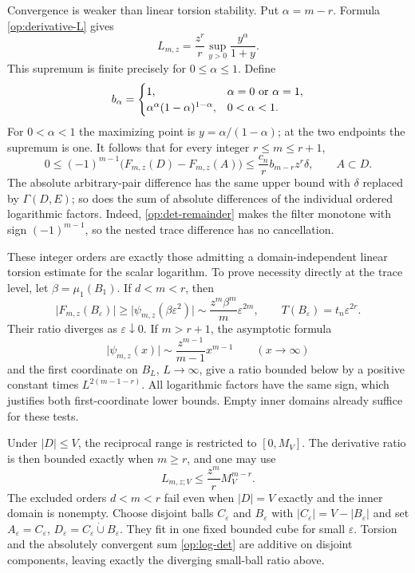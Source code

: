 \documentclass[11pt,reqno]{amsart}
\numberwithin{equation}{section}
\newcommand{\abs}[1]{\lvert#1\rvert}
\begin{document}
Convergence is weaker than linear torsion stability.  Put
$\alpha=m-r$.  Formula \eqref{op:derivative-L} gives
\[
 L_{m,z}=\frac{z^r}{r}
       \sup_{y>0}\frac{y^\alpha}{1+y}.
\]
This supremum is finite precisely for $0\le\alpha\le1$.
Define
\[
 b_\alpha=
 \begin{cases}
  1,&\alpha=0\ \hbox{or}\ \alpha=1,\\
  \alpha^\alpha(1-\alpha)^{1-\alpha},&0<\alpha<1.
 \end{cases}
\]
For $0<\alpha<1$ the maximizing point is
$y=\alpha/(1-\alpha)$; at the two endpoints the supremum is one.
It follows that for every integer $r\le m\le r+1$,
\begin{equation}\label{op:det-stability}
 0\le(-1)^{m-1}\bigl(F_{m,z}(D)-F_{m,z}(A)\bigr)
 \le\frac{c_n}{r}b_{m-r}z^r\delta,
 \qquad A\subset D.
\end{equation}
The absolute arbitrary-pair difference has the same upper bound
with $\delta$ replaced by $\Gamma(D,E)$; so does the sum of
absolute differences of the individual ordered logarithmic factors.
Indeed, \eqref{op:det-remainder} makes the filter monotone with
sign $(-1)^{m-1}$, so the nested trace difference has no
cancellation.

These integer orders are exactly those admitting a domain-independent
linear torsion estimate for the scalar logarithm.  To prove necessity
directly at the trace level, let $\beta=\mu_1(B_1)$.
If $d<m<r$, then
\[
 \abs{F_{m,z}(B_\varepsilon)}
 \ge\abs{\psi_{m,z}(\beta\varepsilon^2)}
 \sim\frac{z^m\beta^m}{m}\varepsilon^{2m},
 \qquad T(B_\varepsilon)=t_n\varepsilon^{2r}.
\]
Their ratio diverges as $\varepsilon\downarrow0$.
If $m>r+1$, the asymptotic formula
\[
 \abs{\psi_{m,z}(x)}
       \sim\frac{z^{m-1}}{m-1}x^{m-1}
       \qquad(x\to\infty)
\]
and the first coordinate on $B_L$, $L\to\infty$, give a ratio
bounded below by a positive constant times $L^{2(m-1-r)}$.
All logarithmic factors have the same sign, which justifies both
first-coordinate lower bounds.  Empty inner domains already suffice
for these tests.

Under $\abs D\le V$, the reciprocal range is restricted to
$[0,M_V]$.  The derivative ratio is then bounded exactly when
$m\ge r$, and one may use
\begin{equation}\label{op:det-local-L}
 L_{m,z;V}\le\frac{z^m}{r}M_V^{m-r}.
\end{equation}
The excluded orders $d<m<r$ fail even when $\abs D=V$ exactly
and the inner domain is nonempty.  Choose disjoint balls
$C_\varepsilon$ and $B_\varepsilon$ with
$\abs{C_\varepsilon}=V-\abs{B_\varepsilon}$ and set
$A_\varepsilon=C_\varepsilon$,
$D_\varepsilon=C_\varepsilon\mathbin{\dot\cup}B_\varepsilon$.
They fit in one fixed bounded cube for small $\varepsilon$.
Torsion and the absolutely convergent sum \eqref{op:log-det} are
additive on disjoint components, leaving exactly the diverging
small-ball ratio above.
\end{document}
